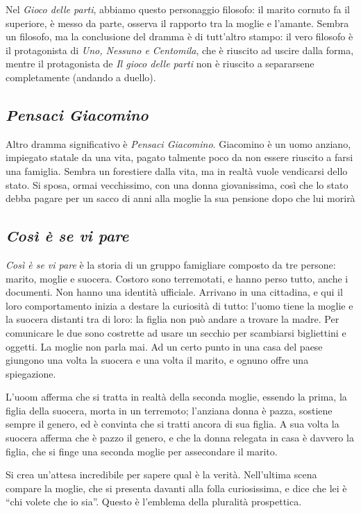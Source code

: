\documentclass[a4paper, twoside, titlepage]{book}
\begin{document}
Nel \textit{Gioco delle parti}, abbiamo questo personaggio filosofo: il marito cornuto fa il superiore, è messo da parte, osserva il rapporto tra la moglie e l’amante.
Sembra un filosofo, ma la conclusione del dramma è di tutt’altro stampo: il vero filosofo è il protagonista di \textit{Uno, Nessuno e Centomila}, che è riuscito ad uscire dalla forma, mentre il protagonista de \textit{Il gioco delle parti} non è riuscito a separarsene completamente (andando a duello).

\subsection{\textit{Pensaci Giacomino}}

Altro dramma significativo è \textit{Pensaci Giacomino}. 
Giacomino è un uomo anziano, impiegato statale da una vita, pagato talmente poco da non essere riuscito a farsi una famiglia.
Sembra un forestiere dalla vita, ma in realtà vuole vendicarsi dello stato.
Si sposa, ormai vecchissimo, con una donna giovanissima, così che lo stato debba pagare per un sacco di anni alla moglie la sua pensione dopo che lui morirà

\subsection{\textit{Così è se vi pare}}

\textit{Così è se vi pare} è la storia di un gruppo famigliare composto da tre persone: marito, moglie e suocera. Costoro sono terremotati, e hanno perso tutto, anche i documenti. Non hanno una identità ufficiale.
Arrivano in una cittadina, e qui il loro comportamento inizia a destare la curiosità di tutto: l’uomo tiene la moglie e la suocera distanti tra di loro: la figlia non può andare a trovare la madre.
Per comunicare le due sono costrette ad usare un secchio per scambiarsi bigliettini e oggetti.
La moglie non parla mai.
Ad un certo punto in una casa del paese giungono una volta la suocera e una volta il marito, e ognuno offre una spiegazione. 

L'uoom afferma che si tratta in realtà della seconda moglie, essendo la prima, la figlia della suocera, morta in un terremoto; l'anziana donna è pazza, sostiene sempre il genero, ed è convinta che si tratti ancora di sua figlia.
A sua volta la suocera afferma che è pazzo il genero, e che la donna relegata in casa è davvero la figlia, che si finge una seconda moglie per assecondare il marito.

Si crea un’attesa incredibile per sapere qual è la verità. Nell’ultima scena compare la moglie, che si presenta davanti alla folla curiosissima, e dice che lei è “chi volete che io sia”.
Questo è l’emblema della pluralità prospettica.
\end{document}
